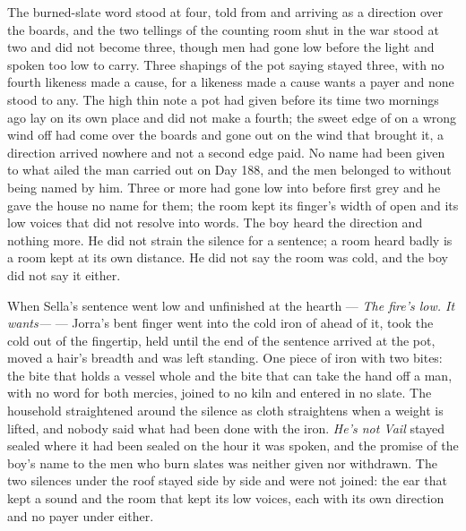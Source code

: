 The burned-slate word stood at four, told from  and arriving as a direction over the boards, and the two tellings of the counting room shut in the war stood at two and did not become three, though men had gone low before the light and spoken too low to carry. Three shapings of the pot saying stayed three, with no fourth likeness made a cause, for a likeness made a cause wants a payer and none stood to any. The high thin note a pot had given before its time two mornings ago lay on its own place and did not make a fourth; the sweet edge of  on a wrong wind off  had come over the boards and gone out on the wind that brought it, a direction arrived nowhere and not a second edge paid. No name had been given to what ailed the man carried out on Day 188, and the men belonged to  without being named by him. Three or more had gone low into  before first grey and he gave the house no name for them; the room kept its finger's width of open and its low voices that did not resolve into words. The boy heard the direction and nothing more. He did not strain the silence for a sentence; a room heard badly is a room kept at its own distance. He did not say the room was cold, and the boy did not say it either.

When Sella's sentence went low and unfinished at the hearth --- \emph{The fire's low. It wants---} --- Jorra's bent finger went into the cold iron of  ahead of it, took the cold out of the fingertip, held until the end of the sentence arrived at the pot, moved a hair's breadth and was left standing. One piece of iron with two bites: the bite that holds a vessel whole and the bite that can take the hand off a man, with no  word for both mercies, joined to no kiln and entered in no slate. The household straightened around the silence as cloth straightens when a weight is lifted, and nobody said what had been done with the iron. \emph{He's not Vail} stayed sealed where it had been sealed on the hour it was spoken, and the promise of the boy's name to the men who burn slates was neither given nor withdrawn. The two silences under the roof stayed side by side and were not joined: the ear that kept a sound and the room that kept its low voices, each with its own direction and no payer under either.

\scenebreak

